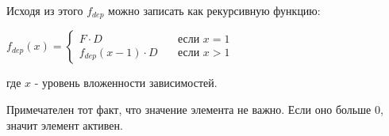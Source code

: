 Исходя из этого $f_{dep}$ можно записать как рекурсивную функцию:
\begin{center}
  $
  f_{dep}(x) = 
  \begin{cases}
    F \cdot D & \quad \text{если } x = 1 \\
    f_{dep}(x - 1) \cdot D & \quad \text{если } x > 1
  \end{cases}
  $
\end{center}
где $x$ - уровень вложенности зависимостей.

Примечателен тот факт, что значение элемента не важно. Если оно больше $0$, значит элемент активен.
